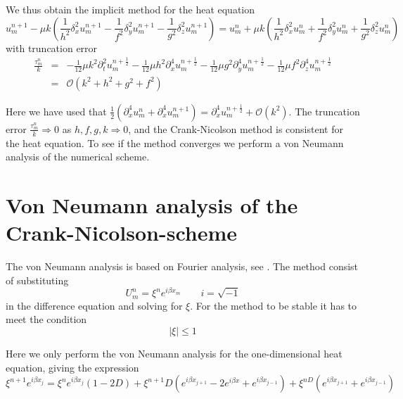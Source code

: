 We thus obtain the implicit method for the heat equation
\begin{equation}
u_m^{n+1}-\mu k(\frac{1}{h^2}\delta_x^2 u_m^{n+1}-\frac{1}{f^2}\delta_y^2 u_m^{n+1}-\frac{1}{g^2}\delta_z^2 u_m^{n+1})=u_m^n + \mu k(\frac{1}{h^2}\delta_x^2 u_m^n + \frac{1}{f^2}\delta_y^2 u_m^n +\frac{1}{g^2}\delta_z^2 u_m^n)
\label{crank}
\end{equation}
with truncation error
\begin{eqnarray}
\frac{\tau_m^ n}{k} &=& -\frac{1}{12} \mu k^2 \partial_t^2 u_m^{n+\frac{1}{2}} - \frac{1}{12} \mu h^2 \partial_x^4 u_m^{n+\frac{1}{2}} - \frac{1}{12} \mu g^2 \partial_y^4 u_m^{n+\frac{1}{2}} - \frac{1}{12} \mu f^2 \partial_z^4 u_m^{n+\frac{1}{2}}\\
&=& \mathcal{O} (k^2 + h^2 + g^2 + f^2)
\label{truncerror}
\end{eqnarray}

Here we have used that $\frac{1}{2}(\partial_x^4 u_m^n + \partial_x^4 u_m^{n+1}) = \partial_x^4 u_m^{n+\frac{1}{2}} + \mathcal{O} (k^2)$. 
The truncation error $\frac{\tau_m^n}{k} \Rightarrow 0$ as $h,f,g,k \Rightarrow 0$, and the Crank-Nicolson method is consistent for the heat equation. To see if the method converges we perform a von Neumann analysis of the numerical scheme.

\section{Von Neumann analysis of the Crank-Nicolson-scheme}

The von Neumann analysis is based on Fourier analysis, see \cite{aarseth}. The method consist of substituting 
\begin{equation*}
	U_m^n=\xi^n e^{i \beta x_m} \quad \quad  i=\sqrt{-1}
\end{equation*}
in the difference equation and solving for $\xi$.
For the method to be stable it has to meet the condition
\begin{equation}
	\mid{\xi}\mid \leq 1
	\label{stabcond}
\end{equation}

Here we only perform the von Neumann analysis for the one-dimensional heat
equation, giving the expression
\begin{equation*}
\xi^{n+1} e^{i\beta x_{j}} = \xi^{n} e^{i\beta x_j}\left(1-2D\right) + \xi^{n+1}D\left(e^{i\beta x_{j+1}} - 2e^{i\beta  x} + e^{i\beta x_{j-1}}\right) + \xi^{nD}\left(e^{i\beta x_{j+1}} + e^{i\beta x_{j-1}}\right)
\end{equation*}

